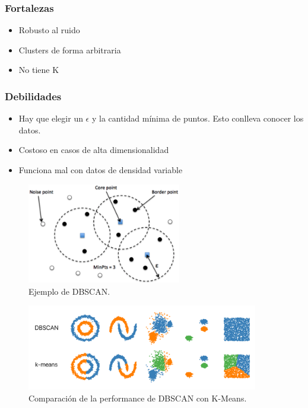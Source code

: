 \documentclass[titlepage,a4paper]{article}
\begin{document}
\subsubsection*{Fortalezas}
\begin{itemize}
    \item Robusto al ruido
    \item Clusters de forma arbitraria
    \item No tiene K
\end{itemize}

\subsubsection*{Debilidades}
\begin{itemize}
    \item Hay que elegir un $\epsilon$ y la cantidad mínima de puntos. Esto conlleva conocer los datos.
    \item Costoso en casos de alta dimensionalidad
    \item Funciona mal con datos de densidad variable
\end{itemize}

\begin{figure}[!htb]
    \centering
    \includegraphics[width=0.6\textwidth]{imagenesResumen/DBSCAN.png}
    \caption{Ejemplo de DBSCAN.}
\end{figure}

\begin{figure}[!htb]
    \centering
    \includegraphics[width=0.9\textwidth]{imagenesResumen/ComparacionKMeansDBSCAN.png}
    \caption{Comparación de la performance de DBSCAN con K-Means.}
\end{figure}
\end{document}

